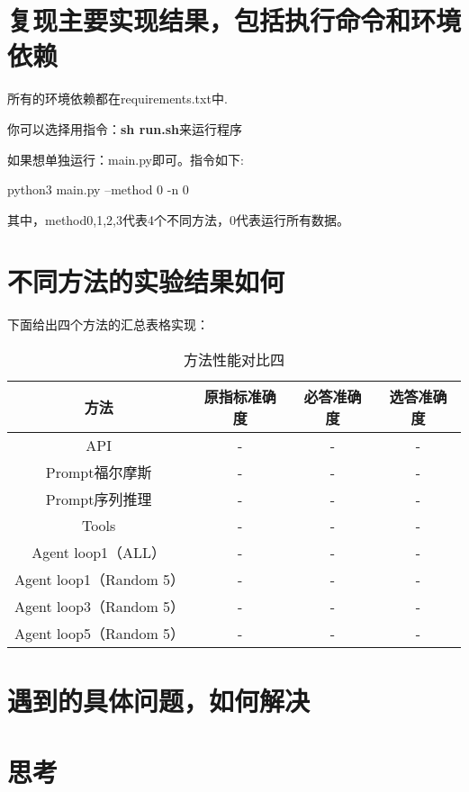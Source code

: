 \documentclass[answers]{exam}  %
\begin{document}
\section{复现主要实现结果，包括执行命令和环境依赖}

所有的环境依赖都在requirements.txt中.

你可以选择用指令：\textbf{sh run.sh}来运行程序

如果想单独运行：main.py即可。指令如下:

python3 main.py --method 0 -n 0

其中，method0,1,2,3代表4个不同方法，0代表运行所有数据。

\section{不同方法的实验结果如何}

下面给出四个方法的汇总表格实现：
\begin{table}[h]
    \centering
    \begin{tabular}{cccc}
    \toprule
    \textbf{方法} & \textbf{原指标准确度} & \textbf{必答准确度} &\textbf{选答准确度}\\
    \midrule
    API & - & - & - \\
    \hline
    Prompt福尔摩斯 & - & - & - \\
    \hline
    Prompt序列推理 & - & - & - \\
    \hline
    Tools & - & - & - \\
    \hline
    Agent loop1（ALL） & - & - & - \\
    \hline
    Agent loop1（Random 5） & - & - & - \\
    \hline
    Agent loop3（Random 5） & - & - & - \\
    \hline
    Agent loop5（Random 5） & - & - & - \\
    \bottomrule
    \end{tabular}
    \caption{方法性能对比四}
\end{table}


\section{遇到的具体问题，如何解决}

\section{思考}
\end{document}
